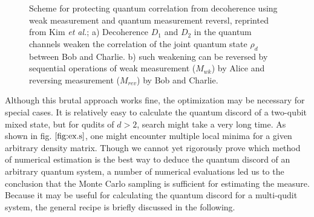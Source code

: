 \documentclass[%
 reprint,
 amsmath,amssymb,
 aps,
]{revtex4-1}
\begin{document}
\begin{figure}
\begin{subfigure}[b]{0.23\textwidth}
                \caption{}
                \label{fig:w}
        \end{subfigure}
        \caption{Scheme for protecting quantum correlation from decoherence using weak measurement and quantum measurement reversl, reprinted from Kim \textit{et al.}; a) Decoherence $D_1$ and $D_2$ in the quantum channels weaken the correlation of the joint quantum state $\rho_d$ between Bob and Charlie. b) such weakening can be reversed by sequential operations of weak measurement ($M_{wk}$) by Alice and reversing measurement ($M_{rev}$) by Bob and Charlie.}\label{fig:scheme}
\end{figure}

Although this brutal approach works fine, the optimization may be necessary for special cases. It is relatively easy to calculate the quantum discord of a two-qubit mixed state, but for qudits of $d>2$, search might take a very long time. As shown in fig. $\ref{fig:ex.s}$, one might encounter multiple local minima for a given arbitrary density matrix. Though we cannot yet rigorously prove which method of numerical estimation is the best way to deduce the quantum discord of an arbitrary quantum system, a number of numerical evaluations led us to the conclusion that the Monte Carlo sampling is sufficient for estimating the measure. Because it may be useful for calculating the quantum discord for a multi-qudit system, the general recipe is briefly discussed in the following.
\end{document}
